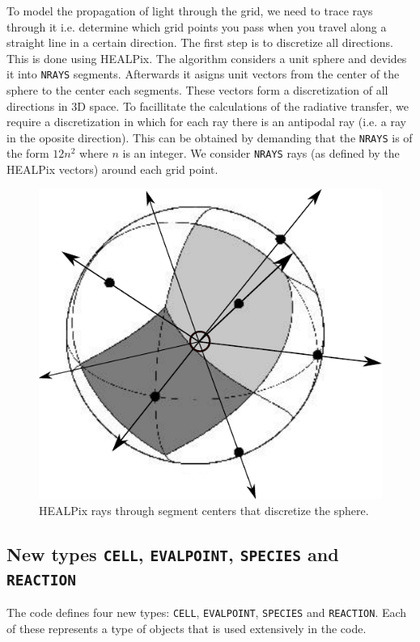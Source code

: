 \documentclass[]{article}
\begin{document}
To model the propagation of light through the grid, we need to trace rays through it i.e. determine which grid points you pass when you travel along a straight line in a certain direction. The first step is to discretize all directions. This is done using HEALPix. The algorithm considers a unit sphere and devides it into \texttt{NRAYS} segments. Afterwards it asigns unit vectors from the center of the sphere to the center each segments. These vectors form a discretization of all directions in 3D space. To facillitate the calculations of the radiative transfer, we require a discretization in which for each ray there is an antipodal ray (i.e. a ray in the oposite direction). This can be obtained by demanding that the \texttt{NRAYS} is of the form $12n^{2}$ where $n$ is an integer. We consider \texttt{NRAYS} rays (as defined by the HEALPix vectors) around each grid point.

\begin{figure}[H]
	\centering
	\includegraphics[scale=.7]{Images/healpixrays.pdf}
	\caption{HEALPix rays through segment centers that discretize the sphere.}
	\label{grid}
\end{figure}

\subsection{New types \texttt{CELL}, \texttt{EVALPOINT}, \texttt{SPECIES} and \texttt{REACTION} }
The code defines four new types: \texttt{CELL}, \texttt{EVALPOINT}, \texttt{SPECIES} and \texttt{REACTION}. Each of these represents a type of objects that is used extensively in the code.
\end{document}
